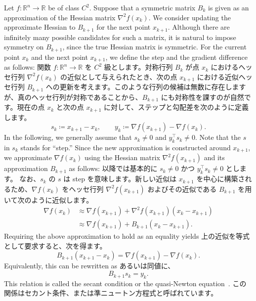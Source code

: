 \documentclass[0_main]{subfiles}
\begin{document}
\ifEn
    Let $f\colon \mathbb{R}^n \to \mathbb{R}$ be of class $C^2$. Suppose that a symmetric matrix $B_k$ is given as an approximation of the Hessian matrix $\nabla^2 f(x_k)$. We consider updating the approximate Hessian to $B_{k+1}$ for the next point $x_{k+1}$. Although there are infinitely many possible candidates for such a matrix, it is natural to impose symmetry on $B_{k+1}$, since the true Hessian matrix is symmetric. For the current point $x_k$ and the next point $x_{k+1}$, we define the step and the gradient difference as follows:
\else
    関数 $f\colon \mathbb{R}^n \to \mathbb{R}$ を $C^2$ 級とします。対称行列 $B_k$ が点 $x_k$ におけるヘッセ行列 $\nabla^2 f(x_k)$ の近似として与えられたとき、次の点 $x_{k+1}$ における近似ヘッセ行列 $B_{k+1}$ への更新を考えます。このような行列の候補は無数に存在しますが、真のヘッセ行列が対称であることから、$B_{k+1}$ にも対称性を課すのが自然です。現在の点 $x_k$ と次の点 $x_{k+1}$ に対して、ステップと勾配差を次のように定義します。
\fi
\begin{equation*}
    s_k \coloneqq x_{k+1} - x_k, \qquad   y_k \coloneqq \nabla f(x_{k+1}) - \nabla f(x_k).
\end{equation*}
\ifEn
    In the following, we generally assume that $s_k \neq 0$ and $y_k^\top s_k \neq 0$.
    Note that the $s$ in $s_k$ stands for ``step.'' Since the new approximation is constructed around $x_{k+1}$, we approximate $\nabla f(x_k)$ using the Hessian matrix $\nabla^2 f(x_{k+1})$ and its approximation $B_{k+1}$ as follows:
\else
    以降では基本的に $s_k \neq 0$ かつ $y_k^\top s_k \neq 0$ とします。 なお、$s_k$ の $s$ は step を意味します。新しい近似は $x_{k+1}$ を中心に構築されるため、$\nabla f(x_k)$ をヘッセ行列 $\nabla^2 f(x_{k+1})$ およびその近似である $B_{k+1}$ を用いて次のように近似します。
\fi
\begin{align*}
    \nabla f(x_k) & \approx \nabla f(x_{k+1}) + \nabla^2 f(x_{k+1})(x_k - x_{k+1}) \\
                  & \approx \nabla f(x_{k+1}) + B_{k+1}(x_k - x_{k+1}).
\end{align*}
\ifEn
    Requiring the above approximation to hold as an equality yields
\else
    上の近似を等式として要求すると、次を得ます。
\fi
\begin{equation*}
    B_{k+1}(x_{k+1} - x_k) = \nabla f(x_{k+1}) - \nabla f(x_k).
\end{equation*}
\ifEn
    Equivalently, this can be rewritten as
\else
    あるいは同値に、
\fi
\begin{equation*}
    B_{k+1} s_k = y_k.
\end{equation*}
\ifEn
    This relation is called the secant condition or the quasi-Newton equation~\citep{nocedal1999numerical}.
\else
    この関係はセカント条件、または準ニュートン方程式と呼ばれています\citep{nocedal1999numerical}。
\fi
\end{document}
